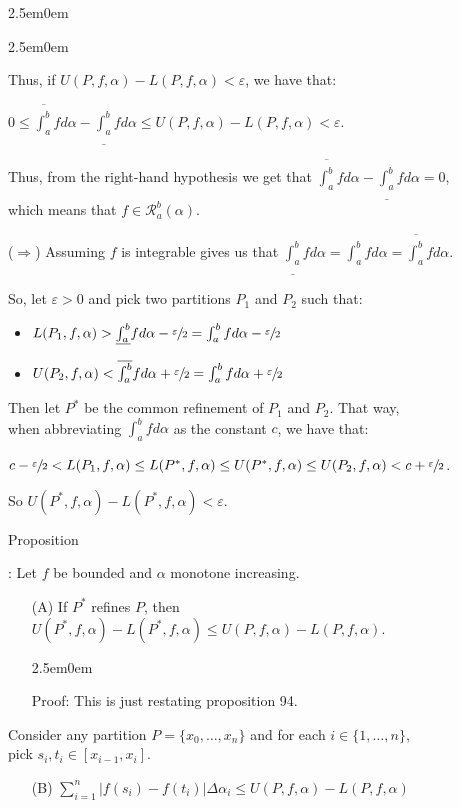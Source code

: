 \documentclass{book}
\newcommand{\hThree}{%
   \color{PineGreen!85!Orange}
   \fontsize{13}{15}\selectfont%
}
\newenvironment{myIndent}{%
   \begin{adjustwidth}{2.5em}{0em}%
}{%
   \end{adjustwidth}%
}
\newcounter{PropNumber}
\newcommand{\propCount}[1][1]{%
   \addtocounter{PropNumber}{#1}%
   \thePropNumber%
}
\newcommand{\retTwo}{\hfill\bigbreak}
\begin{document}
{\begin{myIndent}
{\begin{myIndent}
      Thus, if $U(P, f, \alpha) - L(P, f, \alpha) < \varepsilon$, we have that:
      
      {\center$0 \leq \overline{\int_a^b}fd\alpha - \underline{\int_a^b}fd\alpha \leq U(P, f, \alpha) - L(P, f, \alpha) < \varepsilon$.\retTwo\par}

      Thus, from the right-hand hypothesis we get that $\overline{\int_a^b}fd\alpha - \underline{\int_a^b}fd\alpha = 0$,\\ [-4pt] which means that $f \in \mathscr{R}_a^b(\alpha)$.\retTwo

      ($\Longrightarrow$) Assuming $f$ is integrable gives us that $\underline{\int_a^b}fd\alpha = \int_a^bfd\alpha = \overline{\int_a^b}fd\alpha$.\retTwo
      
      So, let $\varepsilon > 0$ and pick two partitions $P_1$ and $P_2$ such that:
      \begin{itemize}
         \item $L(P_1, f, \alpha) > \underline{\int_a^b}fd\alpha - \sfrac{\varepsilon}{2} = \int_a^bfd\alpha - \sfrac{\varepsilon}{2}$
         \item $U(P_2, f, \alpha) < \overline{\int_a^b}fd\alpha + \sfrac{\varepsilon}{2} = \int_a^bfd\alpha + \sfrac{\varepsilon}{2}$\\
      \end{itemize}

      Then let $P^*$ be the common refinement of $P_1$ and $P_2$. That way,\\ when abbreviating $\int_a^bfd\alpha$ as the constant $c$, we have that:\\ [-8pt]

      {\centering\fontsize{12}{14}\selectfont $c - \sfrac{\varepsilon}{2} < L(P_1, f, \alpha) \leq L(P^*, f, \alpha) \leq U(P^*, f, \alpha) \leq U(P_2, f, \alpha) < c + \sfrac{\varepsilon}{2}$.\retTwo\par}

      So $U(P^*, f, \alpha) - L(P^*, f, \alpha) < \varepsilon$.\retTwo\retTwo
   \end{myIndent}}

   Proposition \propCount: Let $f$ be bounded and $\alpha$ monotone increasing.
   \begin{itemize}
      \item[(A)] If $P^*$ refines $P$, then $U(P^*, f, \alpha) - L(P^*, f, \alpha) \leq U(P, f, \alpha) - L(P, f, \alpha)$.
      
      {\begin{myIndent}\hThree
         Proof: This is just restating proposition 94.\retTwo
      \end{myIndent}}
   \end{itemize}
   Consider any partition $P = \{x_0, \ldots, x_n\}$ and for each $i \in \{1, \ldots, n\}$,\\ pick $s_i, t_i \in [x_{i-1}, x_i]$.
   \begin{itemize}
      \item[(B)] $\sum\limits_{i=1}^n\left|f(s_i) - f(t_i)\right|\Delta \alpha_i \leq U(P, f, \alpha) - L(P, f, \alpha)$
      

\end{itemize}
\end{myIndent}}
\end{document}
